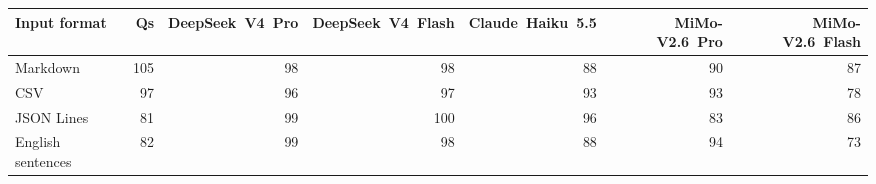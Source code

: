 \begin{tabular}{lrrrrrr}
\toprule
Input format & Qs & DeepSeek\ V4\ Pro & DeepSeek\ V4\ Flash & Claude\ Haiku\ 5.5 & MiMo-V2.6\ Pro & MiMo-V2.6\ Flash \\
\midrule
Markdown & 105 & 98 & 98 & 88 & 90 & 87 \\
CSV & 97 & 96 & 97 & 93 & 93 & 78 \\
JSON Lines & 81 & 99 & 100 & 96 & 83 & 86 \\
English sentences & 82 & 99 & 98 & 88 & 94 & 73 \\
\bottomrule
\end{tabular}
